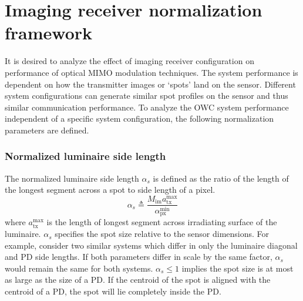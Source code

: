 \section{Imaging receiver normalization framework}
\label{sec:imgFramework}
\graphicspath{{_MIMOSpace/figures_osm/}}

It is desired to analyze the effect of imaging receiver configuration on performance of optical MIMO modulation techniques. The system performance is dependent on how the transmitter images or `spots' land on the sensor. Different system configurations can generate similar spot profiles on the sensor and thus similar communication  performance. To analyze the OWC system performance independent of a specific system configuration, the following normalization parameters are defined.

\subsubsection{Normalized luminaire side length}
\label{subsubsec:frameworkSide}
The normalized luminaire side length $\alpha_{s}$ is defined as the ratio of the length of the longest segment across a spot to side length of a pixel. 
\begin{equation}
	\label{eqAlphaS}
	\alpha_{s} \triangleq \frac{M_{\text{im}} a_{\text{tx}}^{\text{max}}}{\alpha_{\text{px}}^{\text{min}}}
\end{equation}
where $a_{\text{tx}}^{\text{max}}$ is the length of longest segment across irradiating surface of the luminaire. $\alpha_{s}$ specifies the spot size relative to the sensor dimensions. For example, consider two similar systems which differ in only the luminaire diagonal and PD side lengths. If both parameters differ in scale by the same factor, $\alpha_{s}$ would remain the same for both systems. $\alpha_{s}\leq 1$ implies the spot size is at most as large as the size of a PD. If the centroid of the spot is aligned with the centroid of a PD, the spot will lie completely inside the PD.
 
